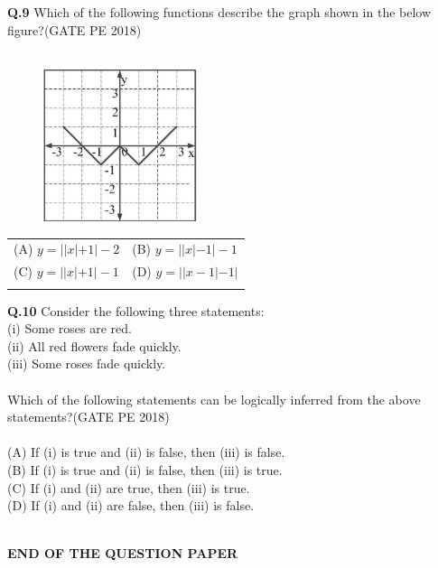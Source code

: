 \documentclass[12pt,a4paper]{article}
\begin{document}
\noindent\textbf{Q.9} Which of the following functions describe the graph shown in the below figure?\hfill(GATE PE 2018)\\\\

\begin{figure}[h!]
  \centering
  \includegraphics[width=0.4\textwidth]{pic1.png} 
  \end{figure}

\begin{tabular}{ll}

{\Large (A) $y = ||x| + 1| - 2$} & {\Large (B) $y = ||x| - 1| - 1$}\\
{\Large (C) $y = ||x| + 1| - 1$} & {\Large (D) $y = ||x - 1| - 1|$}\\\\

\end{tabular}

\noindent\textbf{Q.10} Consider the following three statements:\\
(i) Some roses are red.\\
(ii) All red flowers fade quickly.\\
(iii) Some roses fade quickly.\\\\
Which of the following statements can be logically inferred from the above statements?\hfill(GATE PE 2018)\\\\
(A) If (i) is true and (ii) is false, then (iii) is false.\\
(B) If (i) is true and (ii) is false, then (iii) is true.\\
(C) If (i) and (ii) are true, then (iii) is true.\\
(D) If (i) and (ii) are false, then (iii) is false.\\\\


\begin{center}
	{\LARGE \textbf{END OF THE QUESTION PAPER}}
\end{center}
\end{document}
